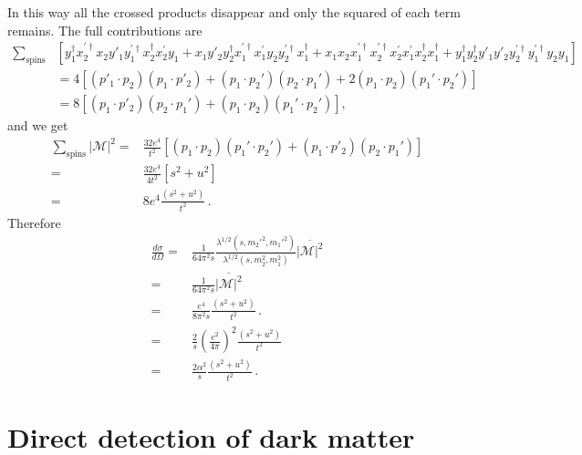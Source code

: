 In this way all the crossed products disappear and only the squared of each term remains. The full contributions are
\begin{align}
 \sum_{\text{spins}}& \left[y^{\dagger}_1x^{\prime\dagger}_2x_2y'_1y^{\prime\dagger}_1x_2^{\dagger} x^{\prime}_2y_1
+x_1y'_2 y^{\dagger}_2x^{\prime\dagger}_1x^{\prime}_1y_2 y^{\prime\dagger}_2x_1^{\dagger} +x_1x_2x^{\prime\dagger}_1x^{\prime\dagger}_2x^{\prime}_2 x^{\prime}_1 x_2^{\dagger} x_1^{\dagger}
+y^{\dagger}_1y^{\dagger}_2y'_1y'_2y_2^{\prime\dagger} y_1^{\prime\dagger} y_2 y_1 \right] \nonumber\\
  &= 4 \left[  \left( p'_1\cdot p_2 \right)\left(p_1\cdot p'_2  \right) + \left( p_1\cdot p_2' \right)\left( p_2\cdot p_1' \right) +2\left( p_1\cdot p_2 \right)\left( p_1'\cdot p_2' \right)
  \right] \nonumber\\
  &= 8 \left[ \left(p_1\cdot p'_2  \right) \left( p_2\cdot p_1' \right) +\left( p_1\cdot p_2 \right)\left( p_1'\cdot p_2' \right)  \right],
\end{align}
and we get
\begin{align}
   \sum_{\text{spins}}|\mathcal{M}|^2=&
\frac{32e^4}{t^2}\left[ \left( p_1\cdot p_2 \right)\left( p_1'\cdot p_2' \right) + \left(p_1\cdot p'_2  \right) \left( p_2\cdot p_1' \right)  \right] \nonumber\\
=& \frac{32e^4}{4t^2} \left[ s^2+u^2 \right] \nonumber\\
=& 8e^4 \frac{\left( s^2+u^2 \right)}{t^2}\,.
\end{align}
Therefore
\begin{align}
   \frac{d\sigma}{d\Omega}=&\frac{1}{64\pi^2s}
\frac{\lambda^{1/2}(s,{m_2'}^2,{m_1'}^2)}{\lambda^{1/2}(s,m_2^2,m_1^2)}
\overline{|\mathcal{M}|^2} \nonumber\\
=&\frac{1}{64\pi^2s}\overline{|\mathcal{M}|^2} \nonumber\\
=&\frac{e^4}{8\pi^2s}\frac{\left( s^2+u^2 \right)}{t^2}\,. \nonumber\\
=&\frac{2}{s}\left( \frac{e^2}{4\pi} \right)^2\frac{\left( s^2+u^2 \right)}{t^2}\nonumber\\
=&\frac{2\alpha^2}{s}\frac{\left( s^2+u^2 \right)}{t^2}\,.
\end{align}






\section{Direct detection of dark matter}



